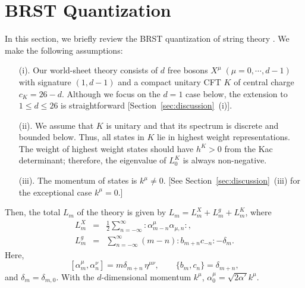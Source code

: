 \documentclass[a4paper,12pt]{article}
\begin{document}


\section{BRST Quantization}\label{sec:brst}

In this section, we briefly review the BRST quantization of string theory
\cite{KO,Big,BMP}. We make the following assumptions:
\begin{enumerate}
%
\item[(i).] Our world-sheet theory consists of $d$ free bosons
$ X^{\mu}\; (\mu = 0,\cdots ,d-1)$ with
signature $ (1, d-1) $ and a compact unitary CFT $ K $ of central charge $
c_{K} = 26-d $. Although we focus on the $d=1$ case below, the extension to $1 \leq d \leq 26$ is straightforward [Section~\ref{sec:discussion}~(i)].
%
\item[(ii).] 
We assume that $K$ is unitary and that its spectrum is discrete and bounded
below. Thus, all states in
$K$ lie in highest weight representations. The weight of highest weight
states should have $h^K>0$ from the Kac determinant; therefore, the
eigenvalue of $L_0^K$ is always non-negative.
%
\item[(iii).] The momentum of states is $k^{\mu} \neq 0$. [See
Section~\ref{sec:discussion}~(iii) for the exceptional case $k^{\mu}=0$.]
%
\end{enumerate}
Then, the total $L_{m}$ of the theory is given by $L_{m} = L_{m}^{X} +
L_{m}^{g} +
L_{m}^{K}$, where
\begin{eqnarray}
%
L_{m}^{X} &=& \frac{1}{2} \sum_{n=-\infty}^{\infty}
                : \alpha^{\mu}_{m-n} \alpha_{\mu,n} :, \\
L_{m}^{g} &=& \sum_{n=-\infty}^{\infty} (m-n) : b_{m+n} c_{-n} : - \delta_{m}.
%
\end{eqnarray}
Here,
\begin{equation}
%
[ \alpha^{\mu}_{m}, \alpha^{\nu}_{n} ] = m \delta_{m+n} \, \eta^{\mu\nu},
\qquad
\{ b_m, c_n \} = \delta_{m+n},
%
\end{equation}
and $\delta_m = \delta_{m,0}$. With the $d$-dimensional momentum $k^\mu$,
$ \alpha^{\mu}_{0} = \sqrt{2\alpha'} k^{\mu} $.
\end{document}
